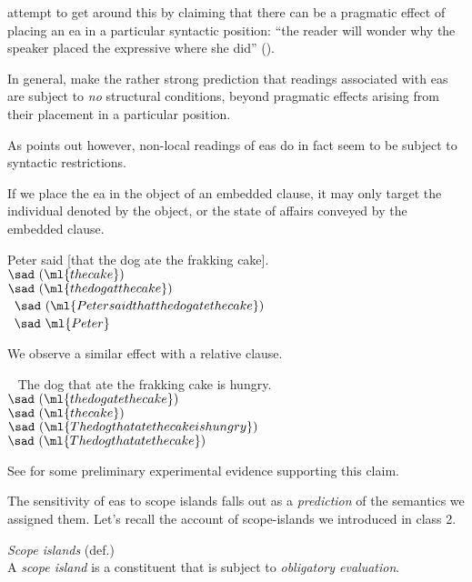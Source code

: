 \documentclass[nols,twoside,nofonts,nobib,nohyper]{tufte-handout}
\begin{document}
\citet{frazierDillonClifton2015} attempt to get around this by claiming that there can be a pragmatic effect of placing an \ac{ea} in a particular syntactic position: \enquote{the reader will wonder why the speaker placed the expressive where she did} (\citealt[p.,296]{frazierDillonClifton2015}).

In general, \citet{frazierDillonClifton2015} make the rather strong prediction that readings associated with \acp{ea} are subject to \textit{no} structural conditions, beyond pragmatic effects arising from their placement in a particular position.

As \citet{gutzmann2019chap4} points out however, non-local readings of \acp{ea} do in fact seem to be subject to syntactic restrictions.

If we place the \ac{ea} in the object of an embedded clause, it may only target the individual denoted by the object, or the state of affairs conveyed by the embedded clause.

\ex
Peter said [that the dog ate the frakking cake].\\
\cmark $\sad (\ml{the cake})$\\
\cmark $\sad (\ml{the dog at the cake})$\\
\xmark $\sad (\ml{Peter said that the dog ate the cake})$\\
\xmark $\sad \ml{Peter}$
\xe

We observe a similar effect with a relative clause.

\ex~
The dog that ate the frakking cake is hungry.\\
\cmark $\sad (\ml{the dog ate the cake})$\\
\cmark $\sad (\ml{the cake})$\\
\xmark $\sad (\ml{The dog that ate the cake is hungry})$\\
\xmark $\sad (\ml{The dog that ate the cake})$\\
\xe

See \citet{gutzmann2015} for some preliminary experimental evidence supporting this claim.

The sensitivity of \acp{ea} to scope islands falls out as a \textit{prediction} of the semantics we assigned them. Let's recall the account of scope-islands we introduced in class 2.

\ex
\textit{Scope islands} (def.)\\
A \textit{scope island} is a constituent that is subject to \textit{obligatory
  evaluation}.\\
\phantom{,}\hfill\citep[p. 90]{Charlowc}
\xe
\end{document}
